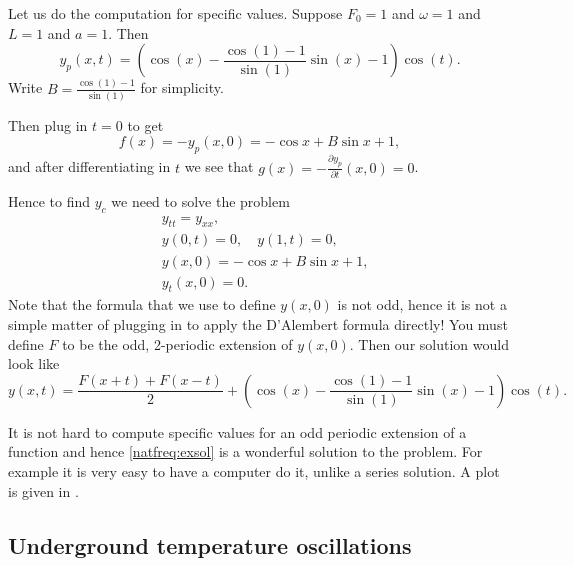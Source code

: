 \begin{example}
Let us do the computation for specific values.
Suppose $F_0 = 1$ and $\omega = 1$ and $L=1$ and $a=1$.  Then 
\begin{equation*}
y_p(x,t) =
\left(
\cos (x) -
\frac{\cos (1) - 1}{\sin (1)}
\sin (x)
-1
\right)
\cos (t) .
\end{equation*}
Write $B = \frac{\cos (1) - 1}{\sin (1)}$ for simplicity.

Then plug in $t=0$ to get
\begin{equation*}
f(x) =- y_p(x,0) = 
- \cos x +
B \sin x
+1 ,
\end{equation*}
and after differentiating in $t$ we see that 
$g(x) = -\frac{\partial y_p}{\partial t}(x,0) = 0$.

Hence to find $y_c$ we need to solve the problem
\begin{align*}
& y_{tt} = y_{xx} , \\
& y(0,t) = 0 , \quad y(1,t) = 0 , \\
& y(x,0) = - \cos x + B \sin x +1 , \\
& y_t(x,0) = 0 .
\end{align*}
Note that the formula that we use to define $y(x,0)$ is not odd,
hence it is not a simple matter of plugging in to apply the D'Alembert
formula directly!  You must define $F$ to be the odd, 2-periodic
extension of $y(x,0)$.  Then our solution would look like
\begin{equation} \label{natfreq:exsol}
y(x,t) = 
\frac{F(x+t) + F(x-t)}{2} + 
\left(
\cos (x) -
\frac{\cos (1) - 1}{\sin (1)}
\sin (x)
-1
\right)
\cos (t) .
\end{equation}

It is not hard to compute specific values
for an odd periodic extension of a function and
hence \eqref{natfreq:exsol} is a wonderful solution to the problem.
For example it is very easy to have a computer do it, unlike a series solution.
A plot is given in .
\begin{myfig}
\capstart
{}
\caption{Plot of $y(x,t) = \frac{F(x+t) + F(x-t)}{2} + \left( \cos (x) -
\frac{\cos (1) - 1}{\sin (1)} \sin (x) -1 \right) \cos (t)$.%
\label{natfreq:forcedvibfig}}
\end{myfig}
\end{example}

\subsection{Underground temperature oscillations}

